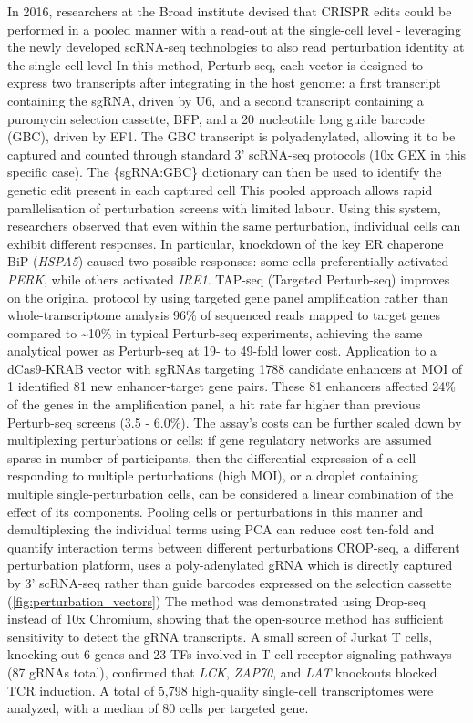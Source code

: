 In 2016, researchers at the Broad institute devised that CRISPR edits could be performed in a pooled manner with a read-out at the single-cell level - leveraging the newly developed scRNA-seq technologies to also read perturbation identity at the single-cell level In this method, Perturb-seq, each vector is designed to express two transcripts after integrating in the host genome: a first transcript containing the sgRNA, driven by U6, and a second transcript containing a puromycin selection cassette, BFP, and a 20 nucleotide long guide barcode (GBC), driven by EF1\textalpha{}. The GBC transcript is polyadenylated, allowing it to be captured and counted through standard 3' scRNA-seq protocols (10x GEX in this specific case). The \{sgRNA:GBC\} dictionary can then be used to identify the genetic edit present in each captured cell This pooled approach allows rapid parallelisation of perturbation screens with limited labour. Using this system, researchers observed that even within the same perturbation, individual cells can exhibit different responses. In particular, knockdown of the key ER chaperone BiP (\textit{HSPA5}) caused two possible responses: some cells preferentially activated \textit{PERK}, while others activated \textit{IRE1\textalpha{}}. TAP-seq (Targeted Perturb-seq) improves on the original protocol by using targeted gene panel amplification rather than whole-transcriptome analysis 96\% of sequenced reads mapped to target genes compared to \textasciitilde10\% in typical Perturb-seq experiments, achieving the same analytical power as Perturb-seq at 19- to 49-fold lower cost. Application to a dCas9-KRAB vector with sgRNAs targeting \num{1788} candidate enhancers at MOI of 1 identified 81 new enhancer-target gene pairs. These 81 enhancers affected 24\% of the genes in the amplification panel, a hit rate far higher than previous Perturb-seq screens (3.5 - 6.0\%). The assay's costs can be further scaled down by multiplexing perturbations or cells: if gene regulatory networks are assumed sparse in number of participants, then the differential expression of a cell responding to multiple perturbations (high MOI), or a droplet containing multiple single-perturbation cells, can be considered a linear combination of the effect of its components. Pooling cells or perturbations in this manner and demultiplexing the individual terms using PCA can reduce cost ten-fold and quantify interaction terms between different perturbations CROP-seq, a different perturbation platform, uses a poly-adenylated gRNA which is directly captured by 3' scRNA-seq rather than guide barcodes expressed on the selection cassette (\autoref{fig:perturbation_vectors}) The method was demonstrated using Drop-seq instead of 10x Chromium, showing that the open-source method has sufficient sensitivity to detect the gRNA transcripts. A small screen of Jurkat T cells, knocking out 6 genes and 23 TFs involved in T-cell receptor signaling pathways (87 gRNAs total), confirmed that \textit{LCK}, \textit{ZAP70}, and \textit{LAT} knockouts blocked TCR induction. A total of 5,798 high-quality single-cell transcriptomes were analyzed, with a median of 80 cells per targeted gene.

